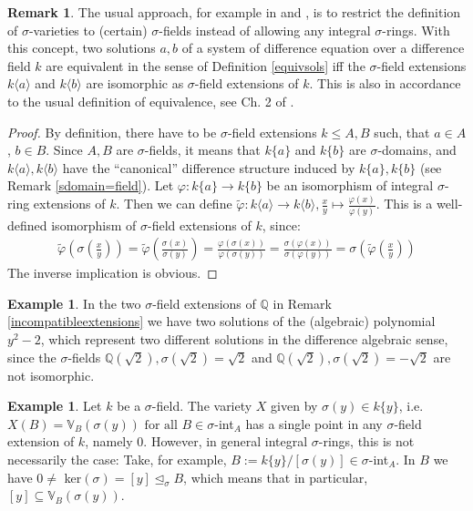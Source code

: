 \documentclass{article}
\def\Q{\mathbb{Q}}
\def\VV{\mathbb{V}}
\def\s{\sigma}
\def\si{\unlhd_{\sigma}}
\def\fa{\text{ for all }}
\newenvironment{bew}{\begin{proof}[Proof]}{\end{proof}}
\theoremstyle{definition}
\newtheorem{ex}[Satz]{Example}
\newtheorem{rem}[Satz]{Remark}
\begin{document}
\begin{rem}
The usual approach, for example in \cite{cohn} and \cite{levin}, is to restrict the definition of $\s$-varieties to (certain) $\s$-fields instead of allowing any integral $\s$-rings. With this concept,
two solutions $a,b$ of a system of difference equation over a difference field $k$ are equivalent in the sense of Definition \ref{equivsols} iff the $\s$-field extensions $k\langle a \rangle$ and $k\langle b \rangle$ are isomorphic as $\s$-field extensions of $k$.
This is also in accordance to the usual definition of equivalence, see Ch. 2 of \cite{wibmer}.
\begin{bew}
By definition, there have to be $\s$-field extensions $k \leq A,B$ such, that $a \in A$, $b \in B$. Since $A,B$ are $\s$-fields, it means that $k\{a\}$ and $k\{b\}$ are $\s$-domains, 
and $k\langle a \rangle, k\langle b \rangle$ have the ``canonical'' difference structure induced by $k\{a\}, k\{b\}$ (see Remark \ref{sdomain=field}). Let $\varphi: k\{a\} \rightarrow k\{b\}$ be an isomorphism of integral $\s$-ring extensions of $k$.
Then we can define $\tilde \varphi: k \langle a \rangle \rightarrow k\langle b \rangle, \frac{x}{y} \mapsto \frac{\varphi(x)}{\varphi{(y)}}$. This is a well-defined isomorphism of $\s$-field extensions of $k$, since:
\begin{align*}
\tilde \varphi (\s (\frac{x}{y})) = \tilde \varphi( \frac{\s(x)}{\s(y)}) = \frac{ \varphi (\s (x))}{ \varphi (\s(y))} =  \frac{\s (\varphi (x))}{\s (\varphi(y))} = \s( \tilde \varphi (\frac{x}{y}))
\end{align*}
The inverse implication is obvious.
\end{bew}
\end{rem}

\begin{ex}
In the two $\s$-field extensions of $\Q$ in Remark \ref{incompatibleextensions} we have two solutions of the (algebraic) polynomial $y^2-2$, which represent two different solutions in the difference algebraic sense,
since the $\s$-fields $\Q(\sqrt{2}), \s(\sqrt{2}) = \sqrt{2}$ and $\Q(\sqrt{2}), \s(\sqrt{2}) = -\sqrt{2}$ are not isomorphic. 
\end{ex}

\begin{ex}
Let $k$ be a $\s$-field. The variety $X$ given by $\s(y) \in k\{y\}$, i.e. $X(B) = \VV_B(\s(y)) \fa B \in \s$-int$_A$ has a single point in any $\s$-field extension of $k$, namely $0$. However, in general integral $\s$-rings,
this is not necessarily the case: Take, for example, $B:= k\{y\}/[\s(y)] \in \s$-int$_A$. In $B$ we have $0 \neq $ ker$(\s) = [y] \si B$, which means that in particular, $[y] \subseteq \VV_B(\s(y))$.
\end{ex}
\end{document}
